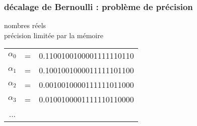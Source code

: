 \begin{frame}
\frametitle{décalage de Bernoulli : problème de 
précision}
\begin{minipage}{0.49\textwidth}
  \begin{center}
  nombres réels \\
  précision limitée par la mémoire
 \end{center}
 \medskip
 \begin{tabular}{c c l}
  $\alpha_0$ & = & 0.1100100100001111110110 \\
  $\alpha_1$ & = & 0.100100100001111110110\textcolor{rouge}{0} \\
  $\alpha_2$ & = & 0.00100100001111110110\textcolor{rouge}{00} \\
  $\alpha_3$ & = & 0.0100100001111110110\textcolor{rouge}{000} \\
  ... \\
 \end{tabular} 
 \medskip
\end{minipage}
\end{frame}
